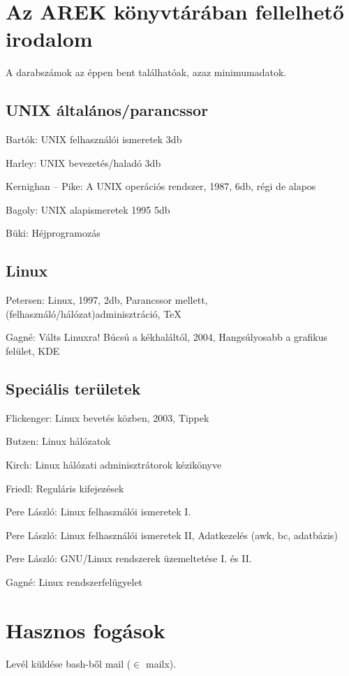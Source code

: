 \documentclass[a4paper]{article}
\begin{document}
\section{Az AREK könyvtárában fellelhető irodalom}
A darabszámok az éppen bent találhatóak, azaz minimumadatok.
\subsection{UNIX általános/parancssor}

Bartók: UNIX felhasználói ismeretek 3db

Harley: UNIX bevezetés/haladó 3db

Kernighan -- Pike: A UNIX operációs rendszer, 1987, 6db, régi de alapos

Bagoly: UNIX alapismeretek 1995 5db

Büki: Héjprogramozás

\subsection{Linux}

Petersen: Linux, 1997, 2db, Parancssor mellett, (felhasználó/hálózat)adminisztráció, TeX

Gagné: Válts Linuxra! Búcsú a kékhaláltól, 2004, Hangsúlyosabb a grafikus felület, KDE

\subsection{Speciális területek}

Flickenger: Linux bevetés közben, 2003, Tippek

Butzen: Linux hálózatok

Kirch: Linux hálózati adminisztrátorok kézikönyve

Friedl: Reguláris kifejezések

Pere László: Linux felhasználói ismeretek I.

Pere László: Linux felhasználói ismeretek II, Adatkezelés (awk, bc, adatbázis)

Pere László: GNU/Linux rendszerek üzemeltetése I. és II.

Gagné: Linux rendszerfelügyelet

\section{Hasznos fogások}

Levél küldése bash-ből mail ($\in$ mailx).
\end{document}
